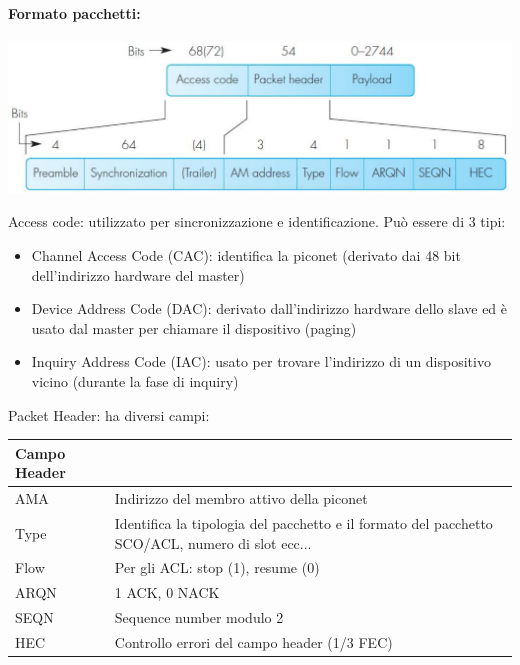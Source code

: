 \paragraph{Formato pacchetti:} 
\begin{center}
	\includegraphics[width=0.9\linewidth]{img/wpan/basebandpacket}
\end{center}

Access code: utilizzato per sincronizzazione e identificazione. Può essere di 3 tipi:
\begin{itemize}
	\item Channel Access Code (CAC): identifica la piconet (derivato dai 48 bit dell'indirizzo hardware del master)

	\item Device Address Code (DAC): derivato dall'indirizzo hardware dello slave ed è usato dal master per chiamare il dispositivo (paging)

	\item Inquiry Address Code (IAC): usato per trovare l'indirizzo di un dispositivo vicino (durante la fase di inquiry)
\end{itemize}

Packet Header: ha diversi campi: 
\begin{center}
	    \begin{tabular}{|l|p{10cm}|}
		\hline
		\textbf{Campo Header} & \\ \hline
		AMA & Indirizzo del membro attivo della piconet \\ \hline
		Type & Identifica la tipologia del pacchetto e il formato del pacchetto SCO/ACL, numero di slot ecc... \\ \hline
		Flow & Per gli ACL: stop (1), resume (0) \\ \hline
		ARQN & 1 ACK, 0 NACK \\ \hline
		SEQN & Sequence number modulo 2 \\ \hline
		HEC & Controllo errori del campo header (1/3 FEC) \\ \hline
	\end{tabular}
\end{center}

